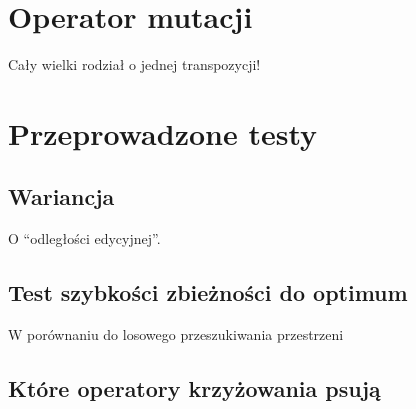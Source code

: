 \documentclass[12pt]{article}
\begin{document}
\section{Operator mutacji}
Cały wielki rodział o jednej transpozycji!
\section{Przeprowadzone testy}
\subsection{Wariancja}
O ``odległości edycyjnej''.
\subsection{Test szybkości zbieżności do optimum}
W porównaniu do losowego przeszukiwania przestrzeni
\subsection{Które operatory krzyżowania psują}
\end{document}
